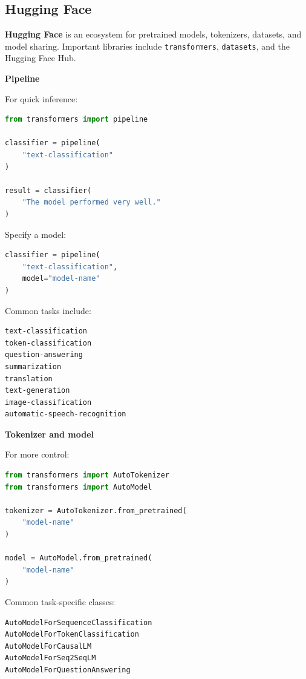\documentclass[11pt,letterpaper]{article}
\begin{document}

\subsection{Hugging Face}

\textbf{Hugging Face} is an ecosystem for pretrained models, tokenizers,
datasets, and model sharing. Important libraries include
\texttt{transformers}, \texttt{datasets}, and the Hugging Face Hub.

\textbf{Pipeline}

For quick inference:

\begin{lstlisting}[language=Python]
from transformers import pipeline

classifier = pipeline(
    "text-classification"
)

result = classifier(
    "The model performed very well."
)
\end{lstlisting}

Specify a model:

\begin{lstlisting}[language=Python]
classifier = pipeline(
    "text-classification",
    model="model-name"
)
\end{lstlisting}

Common tasks include:

\begin{lstlisting}
text-classification
token-classification
question-answering
summarization
translation
text-generation
image-classification
automatic-speech-recognition
\end{lstlisting}

\textbf{Tokenizer and model}

For more control:

\begin{lstlisting}[language=Python]
from transformers import AutoTokenizer
from transformers import AutoModel

tokenizer = AutoTokenizer.from_pretrained(
    "model-name"
)

model = AutoModel.from_pretrained(
    "model-name"
)
\end{lstlisting}

Common task-specific classes:

\begin{lstlisting}
AutoModelForSequenceClassification
AutoModelForTokenClassification
AutoModelForCausalLM
AutoModelForSeq2SeqLM
AutoModelForQuestionAnswering
\end{lstlisting}
\end{document}
